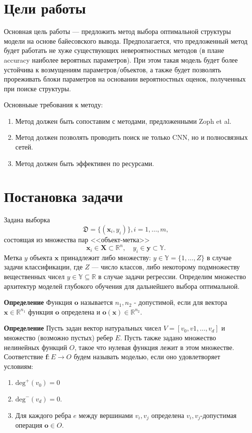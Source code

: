 \documentclass[12pt]{article}
\begin{document}
\section{Цели работы}
Основная цель работы --- предложить метод выбора оптимальной структуры модели на основе байесовского вывода.
Предполагается, что предложенный метод будет работать не хуже существующих невероятностных методов (в плане accuracy наиболее вероятных параметров).
При этом такая модель будет более устойчива к возмущениям параметров/объектов, а также будет позволять прореживать блоки параметров на основании вероятностных оценок, полученных при поиске структуры.

Основныые требования к методу:
\begin{enumerate}
\item Метод должен быть сопоставим с методами, предложенными Zoph et al.
\item Метод должен позволять проводить поиск не только CNN, но и полносвязных сетей.
\item Метод должен быть эффективен по ресурсами.

\end{enumerate}


\clearpage
\section{Постановка задачи}
Задана выборка  \begin{equation}\label{eq:dataset}\mathfrak{D} = \{(\mathbf{x}_i,y_i)\}, i = 1,\dots,m,\end{equation} состоящая из множества пар <<объект-метка>> $$\mathbf{x}_i \in \mathbf{X} \subset \mathbb{R}^n, \quad {y}_i \in \mathbf{y} \subset \mathbb{Y}.$$ Метка ${y}$  объекта $\mathbf{x}$ принадлежит либо множеству: ${y} \in \mathbb{Y} = \{1, \dots, Z\}$ в случае задачи классификации, где $Z$ --- число классов, либо некоторому подмножеству вещественных чисел ${y} \in \mathbb{Y}  \subseteq \mathbb{R}$ в случае задачи регрессии. Определим множество архитектур моделей глубокого обучения для дальнейшего выбора оптимальной. 

\textbf{Определение} Функция $\mathbf{o}$ называется $n_1,n_2$ - допустимой, если для вектора $\mathbf{x} \in \mathbb{R}^{n_1}$ функция $\mathbf{o}$ определена и $\mathbf{o}(\mathbf{x}) \in \mathbb{R}^{n_2}$.


\textbf{Определение} Пусть задан вектор натуральных чисел  $V = [v_0, v1,\dots,v_d]$ и множество (возможно пустых) ребер $E$.
Пусть также задано множество нелинейных функций ${O}$, такое что нулевая функция лежит в этом множестве.
Соответствие $\mathbf{f}: E \to O$ будем называть моделью, если оно удовлетворяет условиям:
\begin{enumerate}
\item $\text{deg}^{+}({v}_0) = 0$
\item $\text{deg}^{-}({v}_d) = 0$.
\item Для каждого ребра $e$ между вершинами $v_i,v_j$ определена $v_i, v_j$-допустимая операция $\mathbf{o} \in O$.  
\end{enumerate}
\end{document}
